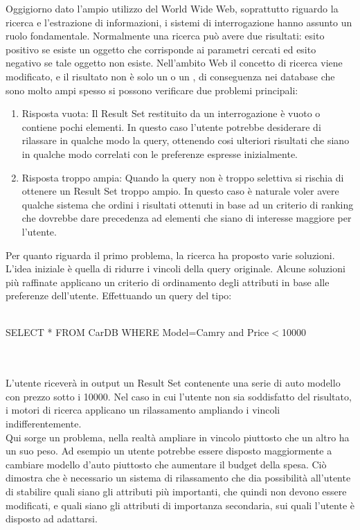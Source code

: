 Oggigiorno dato l'ampio utilizzo del World Wide Web, soprattutto riguardo la ricerca e l'estrazione di informazioni, i sistemi di interrogazione hanno assunto un ruolo fondamentale.
Normalmente una ricerca può avere due risultati: esito positivo se esiste un oggetto che corrisponde ai parametri cercati ed esito negativo se tale oggetto non esiste. Nell'ambito Web il concetto di ricerca viene modificato, e il risultato non è solo un  o un , di conseguenza nei database che  sono molto ampi spesso si possono verificare due problemi principali:
\begin{enumerate}
    \item Risposta vuota: Il Result Set restituito da un interrogazione è vuoto o contiene pochi elementi. In questo caso l'utente potrebbe desiderare di rilassare in qualche modo la query, ottenendo cosi ulteriori risultati che siano in qualche modo correlati con le preferenze espresse inizialmente.
    \item Risposta troppo ampia: Quando la query non è troppo selettiva si rischia di ottenere un Result Set troppo ampio. In questo caso è naturale voler avere qualche sistema che ordini i risultati ottenuti in base ad un criterio di ranking che dovrebbe dare precedenza ad elementi che siano di  interesse maggiore per l'utente.
\end{enumerate}

Per quanto riguarda il primo problema, la ricerca ha proposto varie soluzioni. L'idea iniziale è quella di ridurre i vincoli della query originale. Alcune soluzioni più raffinate applicano un criterio di ordinamento degli attributi in base alle preferenze dell'utente. Effettuando un query del tipo:
\\~\\
\centerline{SELECT * FROM CarDB WHERE Model=Camry and Price$<$10000}
\\~\\
L'utente riceverà in output un Result Set contenente una serie di auto modello  con prezzo sotto i 10000. Nel caso in cui l'utente non sia soddisfatto del risultato, i motori di ricerca applicano un rilassamento ampliando i vincoli indifferentemente. \\
Qui sorge un problema, nella realtà ampliare in vincolo piuttosto che un altro ha un suo peso. Ad esempio un utente potrebbe essere disposto maggiormente a cambiare modello d'auto piuttosto che aumentare il budget della spesa. Ciò dimostra che è necessario un sistema di rilassamento che dia possibilità all'utente di stabilire quali siano gli attributi più importanti, che quindi non devono essere modificati, e quali siano gli attributi di importanza secondaria, sui quali l'utente è disposto ad adattarsi. 
